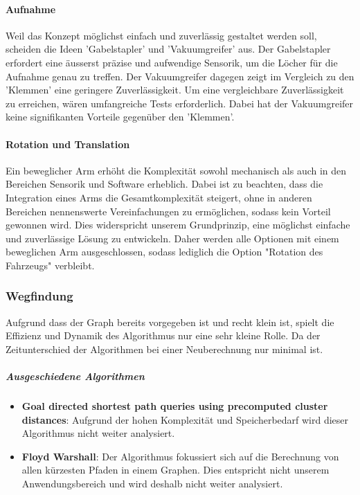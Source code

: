 \documentclass[../main.tex]{subfiles}
\begin{document}
        \paragraph{Aufnahme}
        Weil das Konzept möglichst einfach und zuverlässig gestaltet werden soll, scheiden die Ideen 'Gabelstapler' und 'Vakuumgreifer' aus. Der Gabelstapler erfordert eine äusserst präzise und aufwendige Sensorik, um die Löcher für die Aufnahme genau zu treffen. Der Vakuumgreifer dagegen zeigt im Vergleich zu den 'Klemmen' eine geringere Zuverlässigkeit. Um eine vergleichbare Zuverlässigkeit zu erreichen, wären umfangreiche Tests erforderlich. Dabei hat der Vakuumgreifer  keine signifikanten Vorteile gegenüber den 'Klemmen'.
        
        \paragraph{Rotation und Translation}
        Ein beweglicher Arm erhöht die Komplexität sowohl mechanisch als auch in den Bereichen Sensorik und Software erheblich. Dabei ist zu beachten, dass die Integration eines Arms die Gesamtkomplexität steigert, ohne in anderen Bereichen nennenswerte Vereinfachungen zu ermöglichen, sodass kein Vorteil gewonnen wird. Dies widerspricht unserem Grundprinzip, eine möglichst einfache und zuverlässige Lösung zu entwickeln. Daher werden alle Optionen mit einem beweglichen Arm ausgeschlossen, sodass lediglich die Option "Rotation des Fahrzeugs" verbleibt.


\newpage
\subsubsection{Wegfindung}

Aufgrund dass der Graph bereits vorgegeben ist und recht klein ist, spielt die Effizienz und Dynamik des Algorithmus nur eine sehr kleine Rolle. Da der Zeitunterschied der Algorithmen bei einer Neuberechnung nur minimal ist.

\subparagraph{Ausgeschiedene Algorithmen}

\begin{itemize}
    \item \textbf{Goal directed shortest path queries using precomputed cluster distances}: Aufgrund der hohen Komplexität und Speicherbedarf wird dieser Algorithmus nicht weiter analysiert.
    \item \textbf{Floyd Warshall}: Der Algorithmus fokussiert sich auf die Berechnung von allen kürzesten Pfaden in einem Graphen. Dies entspricht nicht unserem Anwendungsbereich und wird deshalb nicht weiter analysiert.
\end{itemize}
\end{document}

